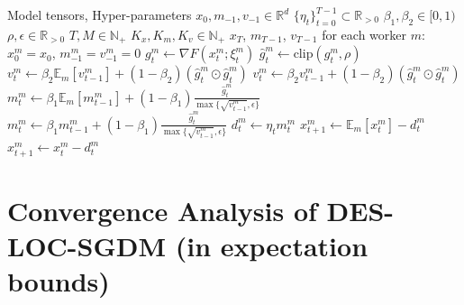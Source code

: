 \begin{algorithm}[h]
\caption{DES-LOC-ADOPT}
\label{alg:desloc_adopt}
\begin{algorithmic}[1]
\REQUIRE Model tensors, Hyper-parameters
\STATE $x_0, m_{-1}, v_{-1} \in \mathbb{R}^d$ 
\STATE $\{\eta_t\}_{t=0}^{T-1} \subset \mathbb{R}_{>0}$ 
\STATE $\beta_1, \beta_2 \in [0,1)$ 
\STATE $\rho, \epsilon \in \mathbb{R}_{>0}$ 
\STATE $T, M \in \mathbb{N}_+$ 
\STATE $K_x, K_m, K_v \in \mathbb{N}_+$ 
\ENSURE $x_T$, $m_{T-1}$, $v_{T-1}$
\STATE for each worker $m$: $x^m_0 = x_0$, $m^m_{-1} = v^m_{-1} = 0$ 
        \STATE $g^m_t \gets \nabla F(x^m_t; \xi^m_t)$ 
        \STATE $\hat{g}^m_t \gets \text{clip}(g^m_t, \rho)$ 
            \STATE $v^m_t \gets \beta_2 \mathbb{E}_m[v^m_{t-1}] + (1 - \beta_2)(\hat{g}^m_t \odot \hat{g}^m_t)$
        \ELSE
            \STATE $v^m_t \gets \beta_2 v^m_{t-1} + (1 - \beta_2)(\hat{g}^m_t \odot \hat{g}^m_t)$
        \ENDIF
            \STATE $m^m_t \gets \beta_1 \mathbb{E}_m[m^m_{t-1}] + (1 - \beta_1) \frac{\hat{g}^m_t}{\max\{\sqrt{v^m_{t-1}}, \epsilon\}}$
        \ELSE
            \STATE $m^m_t \gets \beta_1 m^m_{t-1} + (1 - \beta_1) \frac{\hat{g}^m_t}{\max\{\sqrt{v^m_{t-1}}, \epsilon\}}$ 
        \ENDIF
        \STATE $d^m_t \gets \eta_t m^m_t$
            \STATE $x^m_{t+1} \gets \mathbb{E}_m[x^m_t] - d^m_t$
        \ELSE
            \STATE $x^m_{t+1} \gets x^m_t - d^m_t$
        \ENDIF
    \ENDFOR
\ENDFOR
\end{algorithmic}
\end{algorithm}

\section{Convergence Analysis of DES-LOC-SGDM (in expectation bounds)}
\label{sec:sgdm_proof}

